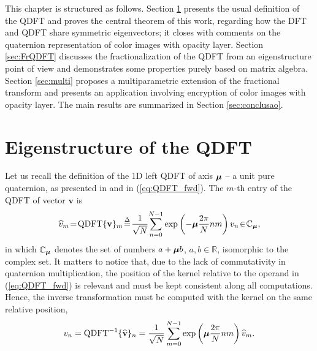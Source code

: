 This chapter is structured as follows. Section \ref{sec:autoestrutura} presents the usual definition of the QDFT and proves the central theorem of this work, regarding how the DFT and QDFT share symmetric eigenvectors; it closes with comments on the quaternion representation of color images with opacity layer. Section \ref{sec:FrQDFT} discusses the fractionalization of the QDFT from an eigenstructure point of view and demonstrates some properties purely based on matrix algebra. Section \ref{sec:multi} proposes a multiparametric extension of the fractional transform and presents an application involving encryption of color images with opacity layer. The main results are summarized in Section \ref{sec:conclusao}.


\section{Eigenstructure of the QDFT}
\label{sec:autoestrutura}
Let us recall the definition of the 1D left QDFT of axis $ \boldsymbol{\mu} $ -- a unit pure quaternion, as presented in \cite[Sec. 3.3.1]{ell2014quaternion} and in (\ref{eq:QDFT_fwd}). The $ m$-th entry of the QDFT of vector $ \mathbf{v} $ is
\begin{equation}
\label{eq:QDFT_fwd}
\!\widehat{v}_m \!=\! \text{QDFT}\{ \mathbf{v} \}_m \!\overset{\Delta}{=}\! \frac{1}{\sqrt{N}} \!\sum_{n=0}^{N-1}  \exp \left( -\qmu \frac{2\pi}{N} nm \right) v_n \!\in\! \mathbb{C}_{\qmu},\!
\end{equation}
in which $ \mathbb{C}_{\boldsymbol{\mu}} $ denotes the set of numbers $ a + \boldsymbol{\mu} b $, $ a,b \in \mathbb{R} $, isomorphic to the complex set. It matters to notice that, due to the lack of commutativity in quaternion multiplication, the position of the kernel relative to the operand in (\ref{eq:QDFT_fwd}) is relevant and must be kept consistent along all computations. Hence, the inverse transformation must be computed with the kernel on the same relative position,
\begin{equation}
\label{eq:QDFT_inv}
v_n = \text{QDFT}^{-1}\{ \widehat{\mathbf{v}} \}_n = \frac{1}{\sqrt{N}}\sum_{m=0}^{N-1}  \exp \left( \boldsymbol{\mu} \frac{2\pi}{N} nm \right) \widehat{v}_m.
\end{equation}

